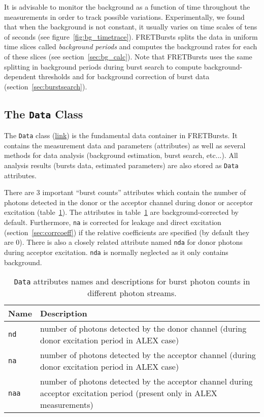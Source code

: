 It is advisable to monitor the background as a function of time
throughout the measurements in order to track possible variations.
Experimentally, we found that when the background is not constant,
it usually varies
on time scales of tens of seconds (see figure~\ref{fig:bg_timetrace}).
FRETBursts splits the data in uniform time
slices called \textit{background periods} and computes the background rates for
each of these slices (see section~\ref{sec:bg_calc}).
Note that FRETBursts uses the same splitting in background periods during burst search 
to compute background-dependent thresholds 
and for background correction of burst data (section~\ref{sec:burstsearch}).

\subsection{The \texttt{Data} Class}
\label{sec:data_intro}

The \verb|Data| class
(\href{http://fretbursts.readthedocs.org/en/latest/data_class.html}{link})
is the fundamental data container in FRETBursts. It contains the
measurement data and parameters (attributes) as well as several methods
for data analysis (background estimation, burst search, etc...).
All analysis results (bursts data, estimated parameters) are also stored
as \verb|Data| attributes.

There are 3 important ``burst counts'' attributes which contain
the number of photons detected in the donor or the acceptor channel
during donor or acceptor excitation (table~\ref{tab:data_n}).
The attributes in table~\ref{tab:data_n} are background-corrected by default.
Furthermore, \verb|na| is corrected for leakage and direct excitation
(section~\ref{sec:corrcoeff}) if the relative coefficients are specified
(by default they are 0).
There is also a closely related attribute named \verb|nda| for donor photons
during acceptor excitation. \verb|nda| is normally neglected as it only contains
background.

\begin{table}
\begin{tabular}{l p{}}
  Name  & Description \\
  \hline
  \verb|nd| & number of photons detected by the donor channel (during donor excitation period in ALEX case)\\
  \verb|na| & number of photons detected by the acceptor channel (during donor excitation period in ALEX case)\\
  \verb|naa| & number of photons detected by the acceptor channel during acceptor excitation period (present only in ALEX measurements)\\
\end{tabular}
\caption{\label{tab:data_n}\texttt{Data} attributes names and descriptions for burst photon counts in different photon streams.}
\end{table}


